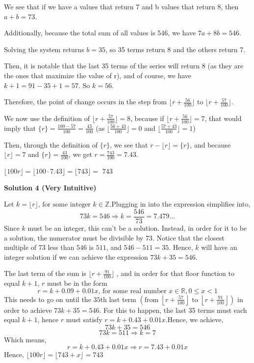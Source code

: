 \begin{enumerate}
 We see that if we have a values that return 7 and b values that return 8, then \( a+b=73 \).

 Additionally, because the total sum of all values is 546, we have \( 7a + 8b = 546 \).

 Solving the system returns \( b=35 \), so 35 terms return 8 and the others return 7.

 Then, it is notable that the last 35 terms of the series will return 8 (as they are the ones that maximize the value of r), and of course, we have \( k+1=91-35+1 =57 \). So \( k = 56 \).

 Therefore, the point of change occurs in the step from \( \lfloor r + \frac{56}{100} \rfloor \) to \( \lfloor r + \frac{57}{100} \rfloor \).

 We now use the definition of \( \lfloor r + \frac{57}{100} \rfloor = 8 \), because if \( \lfloor r + \frac{56}{100} \rfloor = 7 \), that would imply that \( \{r\} = \frac{100-57}{100} = \frac{43}{100} \) (as \( \lfloor \frac{56+43}{100} \rfloor = 0 \) and \( \lfloor \frac{57+43}{100} \rfloor = 1 \))

 Then, through the definition of \( \{r\} \), we see that \( r - \lfloor r \rfloor = \{r\} \), and because \( \lfloor r \rfloor = 7 \) and \( \{r\} = \frac{43}{100} \), we get \( r = \frac{743}{100} = 7.43 \).

 \( \lfloor 100r \rfloor = \lfloor 100 \cdot 7.43 \rfloor = \lfloor 743 \rfloor = \) $\boxed{743}$




\textbf{Solution 4 (Very Intuitive)}

Let $k = \lfloor r \rfloor \text{, for some integer } k \in \mathbb{Z}$.Plugging in into the expression simplifies into,
 \[73k = 546 \Rightarrow k = \frac{546}{73} = 7.479...\]Since $k$ must be an integer, this can't be a solution. Instead, in order for it to be a solution, the numerator must be divisible by $73$. Notice that the closest multiple of $73$ less than $546$ is $511$, and $546 - 511 = 35$. Hence, $k$ will have an integer solution if we can achieve the expression $73k + 35 = 546$.

 The last term of the sum is $\lfloor r + \frac{91}{100} \rfloor$ , and in order for that floor function to equal $k + 1$, $r$ must be in the form 
 \[r = k + 0.09 + 0.01x \text{, for some real number } x \in \mathbb{R}, 0 \le x < 1\]This needs to go on until the $35$th last term $\left(\text{from } \left\lfloor r + \frac{57}{100} \right\rfloor \text{ to } \left\lfloor r + \frac{91}{100} \right\rfloor\right)$ in order to achieve $73k + 35 = 546$. For this to happen, the last 35 terms must each equal $k + 1$, hence $r$ must satisfy $r = k + 0.43 + 0.01x$.Hence, we achieve,
 \[73k + 35 = 546\]
 \[73k = 511 \Rightarrow k = 7\]Which means,
 \[r = k + 0.43 + 0.01x \Rightarrow r = 7.43 + 0.01x\]Hence, $\lfloor 100r \rfloor = \lfloor 743 + x \rfloor = \boxed{743}$




\end{enumerate}
